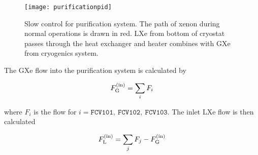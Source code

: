 \begin{table}
\centering
{}
\caption{Parameters queried from slow control system to calculate \fg and \fl.}
\label{tab:electron_lifetime_model_removal_slow_control_pars}
\end{table}

\begin{figure}
\centering
\texttt{[image: purificationpid]}
\caption{Slow control for purification system.  The path of xenon during normal operations is drawn in red.  LXe from bottom of cryostat
passes through the heat exchanger and heater combines with GXe from cryogenics system.}
\label{fig:electron_lifetime_model_slow_control_pur}
\end{figure}

The GXe flow into the purification system is calculated by

\begin{equation}
F_{\mathrm{G}}^{(\mathrm{in})} = \sum_i F_i
\end{equation}

\noindent where $F_i$ is the flow for $i = \mathtt{FCV101,\ FCV102,\ FCV103}$.  The inlet LXe flow is then calculated

\begin{equation}
F_{\mathrm{L}}^{(\mathrm{in})} = \sum_j F_j - F_{\mathrm{G}}^{(\mathrm{in})}
\end{equation}

